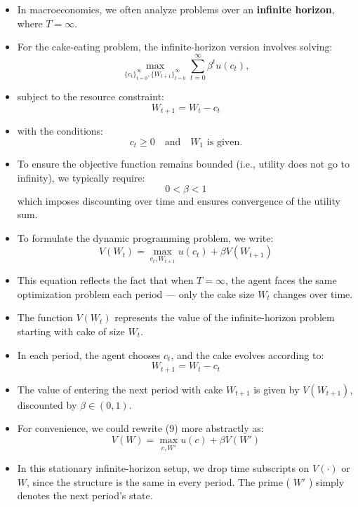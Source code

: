 \documentclass[12pt]{article}
\begin{document}
\begin{itemize}
    \item In macroeconomics, we often analyze problems over an \textbf{infinite horizon}, where \( T = \infty \).
    
    \item For the cake-eating problem, the infinite-horizon version involves solving:
    \[
    \max_{\{c_t\}_{t=0}^\infty, \{W_{t+1}\}_{t=0}^\infty} \sum_{t=0}^{\infty} \beta^t u(c_t),
    \]
    
    \item subject to the resource constraint:
    \[
    W_{t+1} = W_t - c_t
    \]
    
    \item with the conditions:
    \[
    c_t \geq 0 \quad \text{and} \quad W_1 \text{ is given}.
    \]
    
    \item To ensure the objective function remains bounded (i.e., utility does not go to infinity), we typically require:
    \[
    0 < \beta < 1
    \]
    which imposes discounting over time and ensures convergence of the utility sum.
\end{itemize}

\begin{itemize}
    \item To formulate the dynamic programming problem, we write:
    \[
    V(W_t) = \max_{c_t, W_{t+1}} u(c_t) + \beta V(W_{t+1}) \tag{9}
    \]

    \item This equation reflects the fact that when \( T = \infty \), the agent faces the same optimization problem each period — only the cake size \( W_t \) changes over time.

    \item The function \( V(W_t) \) represents the value of the infinite-horizon problem starting with cake of size \( W_t \).

    \item In each period, the agent chooses \( c_t \), and the cake evolves according to:
    \[
    W_{t+1} = W_t - c_t
    \]

    \item The value of entering the next period with cake \( W_{t+1} \) is given by \( V(W_{t+1}) \), discounted by \( \beta \in (0, 1) \).

    \item For convenience, we could rewrite (9) more abstractly as:
    \[
    V(W) = \max_{c, W'} u(c) + \beta V(W')
    \]

    \item In this stationary infinite-horizon setup, we drop time subscripts on \( V(\cdot) \) or \( W \), since the structure is the same in every period. The prime ( \( W' \) ) simply denotes the next period's state.
\end{itemize}
\end{document}

